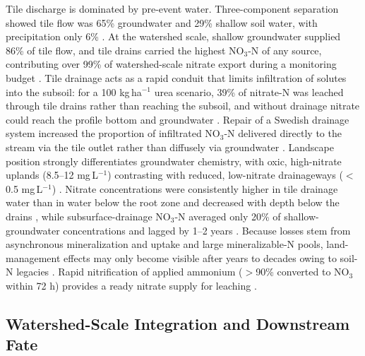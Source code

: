 \documentclass[11pt]{article}
\begin{document}
Tile discharge is dominated by pre-event water. Three-component separation showed tile flow was 65\% groundwater and 29\% shallow soil water, with precipitation only 6\% \parencite{Williams2022}. At the watershed scale, shallow groundwater supplied 86\% of tile flow, and tile drains carried the highest NO$_3$-N of any source, contributing over 99\% of watershed-scale nitrate export during a monitoring budget \parencite{Grose2022}. Tile drainage acts as a rapid conduit that limits infiltration of solutes into the subsoil: for a 100 kg\,ha$^{-1}$ urea scenario, 39\% of nitrate-N was leached through tile drains rather than reaching the subsoil, and without drainage nitrate could reach the profile bottom and groundwater \parencite{Filipovic2015}. Repair of a Swedish drainage system increased the proportion of infiltrated NO$_3$-N delivered directly to the stream via the tile outlet rather than diffusely via groundwater \parencite{Wesström2015}. Landscape position strongly differentiates groundwater chemistry, with oxic, high-nitrate uplands (8.5--12 mg\,L$^{-1}$) contrasting with reduced, low-nitrate drainageways ($<$0.5 mg\,L$^{-1}$) \parencite{Schilling2007}. Nitrate concentrations were consistently higher in tile drainage water than in water below the root zone and decreased with depth below the drains \parencite{Randall2000}, while subsurface-drainage NO$_3$-N averaged only 20\% of shallow-groundwater concentrations and lagged by 1--2 years \parencite{Derby2009}. Because losses stem from asynchronous mineralization and uptake and large mineralizable-N pools, land-management effects may only become visible after years to decades owing to soil-N legacies \parencite{Cambardella1999,Bauwe2020}. Rapid nitrification of applied ammonium ($>$90\% converted to NO$_3$ within 72 h) provides a ready nitrate supply for leaching \parencite{Hu2024}.

\subsection{Watershed-Scale Integration and Downstream Fate}
\end{document}
